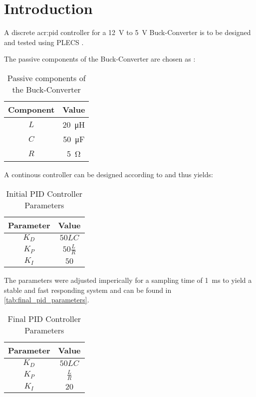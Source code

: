 \chapter{Introduction}
\label{chapter:introduction}

A discrete \gls{acr:pid} controller for a \qty{12}{\volt} to \qty{5}{\volt} Buck-Converter is to be designed and tested using PLECS \autocite{PLECSPlexim}.

The passive components of the Buck-Converter are chosen as :

\begin{table}[htbp]
    \centering
    \begin{tabular}{c|c}
        Component & Value \\ \hline
        $L$ & \qty{20}{\micro\henry} \\ 
        $C$ & \qty{50}{\micro\farad} \\ 
        $R$ & \qty{5}{\ohm} \\ 
    \end{tabular}
    \caption{Passive components of the Buck-Converter}
    \label{tab:components}
\end{table}

A continous controller can be designed according to \autocite{samosirSimpleFormulaDesigning2023} and thus yields:

\begin{table}[htbp]
    \centering
    \begin{tabular}{c|c}
        Parameter & Value \\ \hline
        $K_D$ & $50 LC$ \\ 
        $K_P$ & $50 \frac{L}{R}$ \\ 
        $K_I$ & $50$ \\ 
    \end{tabular}
    \caption{Initial PID Controller Parameters}
    \label{tab:pid_parameters}
\end{table}

The parameters were adjusted imperically for a sampling time of \qty{1}{\milli\second} to yield a stable and fast responding system and can be found in \autoref{tab:final_pid_parameters}.

\begin{table}[htbp]
    \centering
    \begin{tabular}{c|c}
        Parameter & Value \\ \hline
        $K_D$ & $50 LC$ \\ 
        $K_P$ & $\frac{L}{R}$ \\ 
        $K_I$ & $20$ \\ 
    \end{tabular}
    \caption{Final PID Controller Parameters}
    \label{tab:final_pid_parameters}
\end{table}




